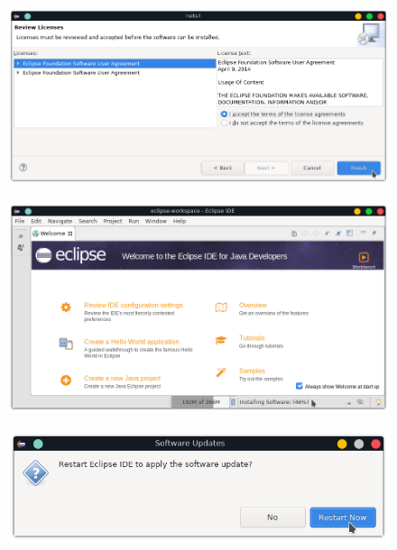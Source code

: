 \documentclass{article}
\begin{document}
\newpage

\begin{figure}[h!]
  \centering
  \includegraphics[scale=0.75]{./Pictures/006_aceptar_terminos.png}
\end{figure}

\begin{figure}[h!]
  \centering
  \includegraphics[scale=0.75]{./Pictures/007_instalando.png}
\end{figure}

\begin{figure}[h!]
  \centering
  \includegraphics[scale=0.75]{./Pictures/008_restart.png}
\end{figure}

\newpage
\end{document}
